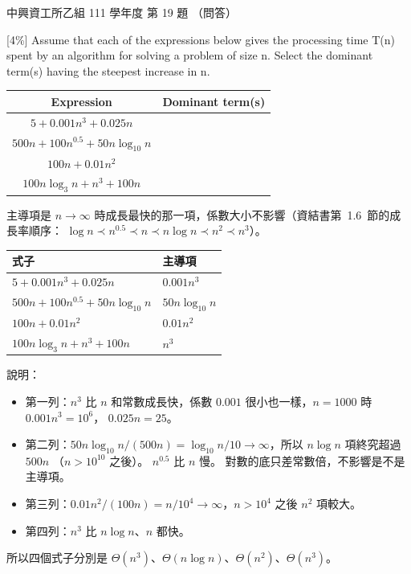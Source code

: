 \begin{pastexam}[label={px:nchu-111-is-08}]{中興資工所乙組 111 學年度 第 19 題}
（問答）

{[4\%]} Assume that each of the expressions below gives the processing time T(n) spent by an algorithm for
solving a problem of size n. Select the dominant term(s) having the steepest increase in n.
\begin{center}
\begin{tabular}{|c|p{6cm}|}
\hline
Expression & \centering Dominant term(s) \tabularnewline \hline
$5 + 0.001n^3 + 0.025n$ & \\ \hline
$500n + 100n^{0.5} + 50n\log_{10} n$ & \\ \hline
$100n + 0.01n^2$ & \\ \hline
$100n\log_3 n + n^3 + 100n$ & \\ \hline
\end{tabular}
\end{center}
\end{pastexam}

\begin{pastsoln}
主導項是 $n \to \infty$ 時成長最快的那一項，係數大小不影響（資結書第~1.6~節的成長率順序：
$\log n \prec n^{0.5} \prec n \prec n\log n \prec n^2 \prec n^3$）。
\begin{center}
\begin{tabular}{ll}
\toprule
式子 & 主導項 \\
\midrule
$5 + 0.001n^3 + 0.025n$ & $0.001n^3$ \\
$500n + 100n^{0.5} + 50n\log_{10} n$ & $50n\log_{10} n$ \\
$100n + 0.01n^2$ & $0.01n^2$ \\
$100n\log_3 n + n^3 + 100n$ & $n^3$ \\
\bottomrule
\end{tabular}
\end{center}
說明：
\begin{itemize}
\item 第一列：$n^3$ 比 $n$ 和常數成長快，係數 $0.001$ 很小也一樣，$n = 1000$ 時 $0.001n^3 = 10^6$，
$0.025n = 25$。
\item 第二列：$50n\log_{10} n / (500n) = \log_{10} n / 10 \to \infty$，所以 $n\log n$ 項終究超過 $500n$
（$n > 10^{10}$ 之後）。 $n^{0.5}$ 比 $n$ 慢。 對數的底只差常數倍，不影響是不是主導項。
\item 第三列：$0.01n^2 / (100n) = n/10^4 \to \infty$，$n > 10^4$ 之後 $n^2$ 項較大。
\item 第四列：$n^3$ 比 $n\log n$、$n$ 都快。
\end{itemize}
所以四個式子分別是 $\Theta(n^3)$、$\Theta(n\log n)$、$\Theta(n^2)$、$\Theta(n^3)$。
\end{pastsoln}
